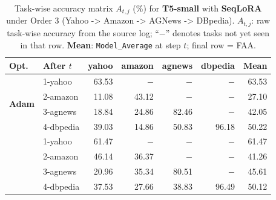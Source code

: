 \begin{table}[ht]
\centering
\caption{%
  Task-wise accuracy matrix $A_{t,j}$ (\%) for \textbf{T5-small} with \textbf{SeqLoRA} under Order 3 (Yahoo -> Amazon -> AGNews -> DBpedia).
  $A_{t,j}$: raw task-wise accuracy from the source log; ``$-$'' denotes tasks not yet seen in that row.
  \textbf{Mean}: \texttt{Model\_Average} at step $t$; final row = FAA.
}
\label{tab:nlp_o3_t5small_seqlora}
\setlength{\tabcolsep}{4.0pt}
\renewcommand{\arraystretch}{0.92}
\scriptsize
\begin{tabular}{@{}l l r r r r r@{}}
\toprule
\textbf{Opt.} & \textbf{After $t$} & \textbf{yahoo} & \textbf{amazon} & \textbf{agnews} & \textbf{dbpedia} & \textbf{Mean} \\
\midrule
\multirow{4}{*}{\textbf{Adam}} & 1-yahoo & 63.53 & $-$ & $-$ & $-$ & 63.53 \\
 & 2-amazon & 11.08 & 43.12 & $-$ & $-$ & 27.10 \\
 & 3-agnews & 18.84 & 24.86 & 82.46 & $-$ & 42.05 \\
 & 4-dbpedia & 39.03 & 14.86 & 50.83 & 96.18 & 50.22 \\
\addlinespace[2pt]
\multirow{4}{*}{\textbf{SAM}} & 1-yahoo & 61.47 & $-$ & $-$ & $-$ & 61.47 \\
 & 2-amazon & 46.14 & 36.37 & $-$ & $-$ & 41.26 \\
 & 3-agnews & 20.96 & 35.34 & 80.51 & $-$ & 45.61 \\
 & 4-dbpedia & 37.53 & 27.66 & 38.83 & 96.49 & 50.12 \\
\bottomrule
\end{tabular}
\end{table}

